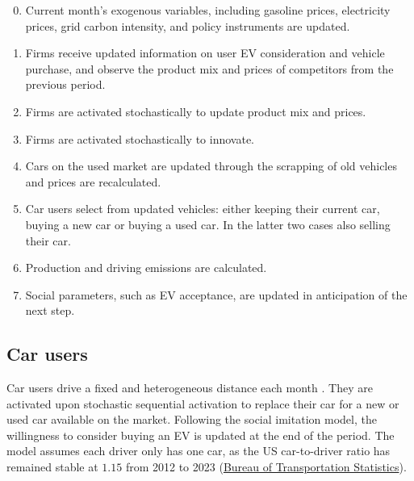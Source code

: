 \documentclass[12pt]{article}
\begin{document}
        \begin{enumerate}
            \setcounter{enumi}{-1} %
            \item Current month's exogenous variables, including gasoline prices, electricity
            prices, grid carbon intensity, and policy instruments are updated.
            \item Firms receive updated information on user EV consideration and vehicle
            purchase, and observe the product mix and prices of competitors from the previous period.
            \item Firms are activated stochastically to update product mix and prices.
            \item Firms are activated stochastically to innovate.
            \item Cars on the used market are updated through the scrapping of old vehicles and prices are recalculated.
            \item Car users select from updated vehicles: either keeping their current car, buying a new car or buying a used car. In the latter two cases also selling their car.
            \item Production and driving emissions are calculated.
            \item Social parameters, such as EV acceptance, are updated in anticipation of
            the next step.
        \end{enumerate}

	\subsection{Car users} \label{Model_Users}
	Car users drive a fixed and heterogeneous distance each month \citep{zhang2025effect}. They are activated upon stochastic sequential activation to replace their car for a new or used car available on the market. Following the social imitation model, the willingness to consider buying an EV is updated at the end of the period. The model assumes each driver only has one car, as the US car-to-driver ratio has remained stable at $1.15$ from 2012 to 2023 (\href{https://www.bts.gov/browse-statistical-products-and-data/state-transportation-statistics/state-highway-travel}{Bureau of Transportation Statistics}). %
\end{document}
